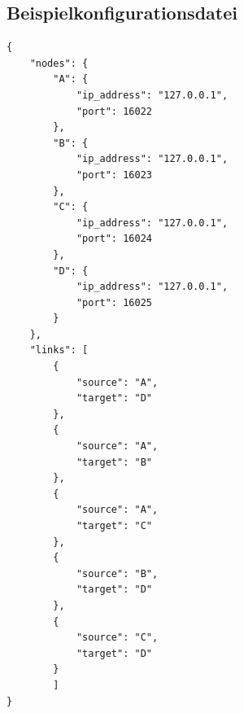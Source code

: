 \documentclass[a4paper,ngerman]{article}
\begin{document}
\clearpage
\begin{appendix}

\section{Beispielkonfigurationsdatei}
\label{appendix:config}

\begin{verbatim}
{
    "nodes": {
        "A": {
            "ip_address": "127.0.0.1",
            "port": 16022
        },
        "B": {
            "ip_address": "127.0.0.1",
            "port": 16023
        },
        "C": {
            "ip_address": "127.0.0.1",
            "port": 16024
        },
        "D": {
            "ip_address": "127.0.0.1",
            "port": 16025
        }
    },
    "links": [
        {
            "source": "A",
            "target": "D"
        },
        {
            "source": "A",
            "target": "B"
        },
        {
            "source": "A",
            "target": "C"
        },
        {
            "source": "B",
            "target": "D"
        },
        {
            "source": "C",
            "target": "D"
        }
        ]
}
\end{verbatim}

\end{appendix}
\end{document}
